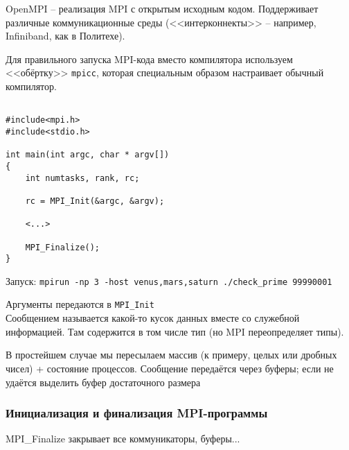 \documentclass[main.tex]{subfiles}
\begin{document}
OpenMPI -- реализация MPI с открытым исходным кодом.
Поддерживает различные коммуникационные среды (<<интерконнекты>> -- например, Infiniband, как в Политехе).

Для правильного запуска MPI-кода вместо компилятора используем  <<обёртку>>  \texttt{mpicc}, которая специальным образом настраивает обычный компилятор.

\begin{verbatim}

#include<mpi.h>
#include<stdio.h>

int main(int argc, char * argv[])
{
	int numtasks, rank, rc;
	
	rc = MPI_Init(&argc, &argv);
	
	<...>
	
	MPI_Finalize();
}

\end{verbatim}

Запуск: \texttt{mpirun -np 3 -host venus,mars,saturn ./check\_prime 99990001}

Аргументы передаются в \texttt{MPI\_Init} \\

Сообщением называется какой-то кусок данных вместе со служебной информацией.
Там содержится в том числе тип (но MPI переопределяет типы).

В простейшем случае мы пересылаем массив (к примеру, целых или дробных чисел) + состояние процессов.
Сообщение передаётся через буферы; если не удаётся выделить буфер достаточного размера

\subsubsection{ Инициализация и финализация MPI-программы }

MPI\_Finalize закрывает все коммуникаторы, буферы...
\end{document}
